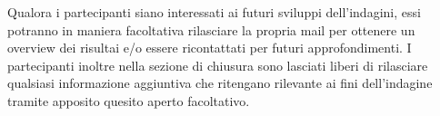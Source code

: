    Qualora i partecipanti siano interessati ai futuri sviluppi dell'indagini, essi potranno in maniera facoltativa rilasciare la propria mail per ottenere un overview dei risultai e/o essere ricontattati per futuri approfondimenti. I partecipanti inoltre nella sezione di chiusura sono lasciati liberi di rilasciare qualsiasi informazione aggiuntiva che ritengano rilevante ai fini dell'indagine tramite apposito quesito aperto facoltativo.
    
   

\newpage
